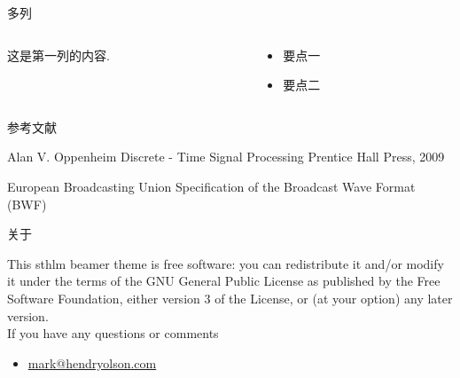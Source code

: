 \documentclass[newPxFont,sthlmFooter]{beamer}
\begin{document}

\begin{frame}{多列}
\begin{columns}
\begin{column}{.48\linewidth}
		这是第一列的内容.
\end{column}
\begin{column}{.48\linewidth}
		\begin{itemize}
        	\item 要点一
        	\item 要点二
		\end{itemize}
	\end{column}
	\end{columns}
\end{frame}

\begin{frame}{参考文献}
	\begin{thebibliography}{10}

	\beamertemplatebookbibitems
	Alan V. Oppenheim
	\newblock Discrete - Time Signal Processing
	\newblock Prentice Hall Press, 2009

	\beamertemplatearticlebibitems
	European Broadcasting Union
	\newblock Specification of the Broadcast Wave Format (BWF)

  \end{thebibliography}
\end{frame}

%
%

\begin{frame}{关于}

This sthlm beamer theme is free software: you can redistribute it and/or modify
it under the terms of the GNU General Public License as published by
the Free Software Foundation, either version 3 of the License, or
(at your option) any later version.\\

If you have any questions or comments
\begin{itemize}
	\item \url{mark@hendryolson.com}
\end{itemize}
\end{frame}
\end{document}
